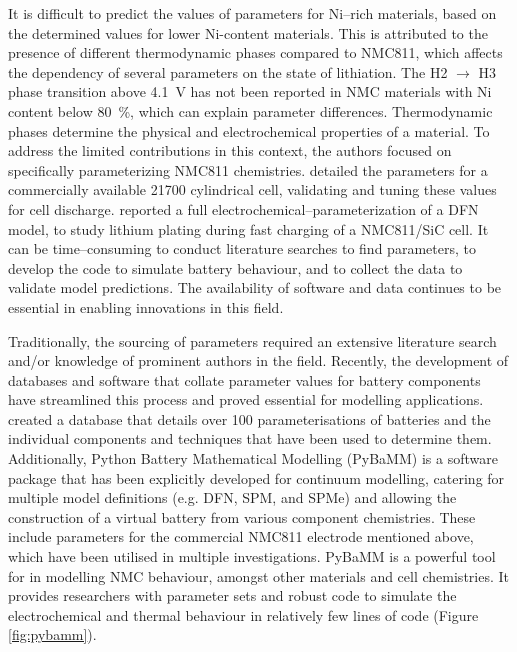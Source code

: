 \documentclass[journal=jacsat,manuscript=article]{achemso}
\begin{document}
It is difficult to predict the values of parameters for Ni--rich materials, based on the determined values for lower Ni-content materials.\cite{Amin_Chiang_2016} 
This is attributed to the presence of different thermodynamic phases compared to NMC811, which affects the dependency of several parameters on the state of lithiation. 
The H2 $\rightarrow$ H3 phase transition above \SI{4.1}{V} has not been reported in NMC materials with Ni content below 80~\%, which can explain parameter differences.\cite{jung2017oxygen} 
Thermodynamic phases determine the physical and electrochemical properties of a material.
To address the limited contributions in this context, the authors focused on specifically parameterizing NMC811 chemistries. 
\citeauthor{Chen2020} detailed the parameters for a commercially available 21700 cylindrical cell, validating and tuning these values for cell discharge.\cite{Chen2020} 
\citeauthor{Sturm2019} reported a full electrochemical--parameterization of a DFN model, to study lithium plating during fast charging of a NMC811/SiC cell.\cite{Sturm2019b,Sturm2019} 
It can be time--consuming to conduct literature searches to find parameters, to develop the code to simulate battery behaviour, and to collect the data to validate model predictions. 
The availability of software and data continues to be essential in enabling innovations in this field.

Traditionally, the sourcing of parameters required an extensive literature search and/or knowledge of prominent authors in the field. 
Recently, the development of databases and software that collate parameter values for battery components have streamlined this process and proved essential for modelling applications.\cite{Tranter2020,Tranter_2020b} 
\citeauthor{liiondb} created a database that details over 100 parameterisations of batteries and the individual components and techniques that have been used to determine them.\cite{liiondb} 
Additionally, Python Battery Mathematical Modelling (PyBaMM) is a software package that has been explicitly developed for continuum modelling, catering for multiple model definitions (e.g. DFN, SPM, and SPMe) and allowing the construction of a virtual battery from various component chemistries.\cite{Sulzer_2020} 
These include parameters for the commercial NMC811 electrode mentioned above,\cite{Chen2020} which have been utilised in multiple investigations.\cite{Tranter2020,Tranter_2020b} 
PyBaMM is a powerful tool for in modelling NMC behaviour, amongst other materials and cell chemistries. It provides researchers with parameter sets and robust code to simulate the electrochemical and thermal behaviour in relatively few lines of code (Figure \ref{fig:pybamm}). 
\end{document}
